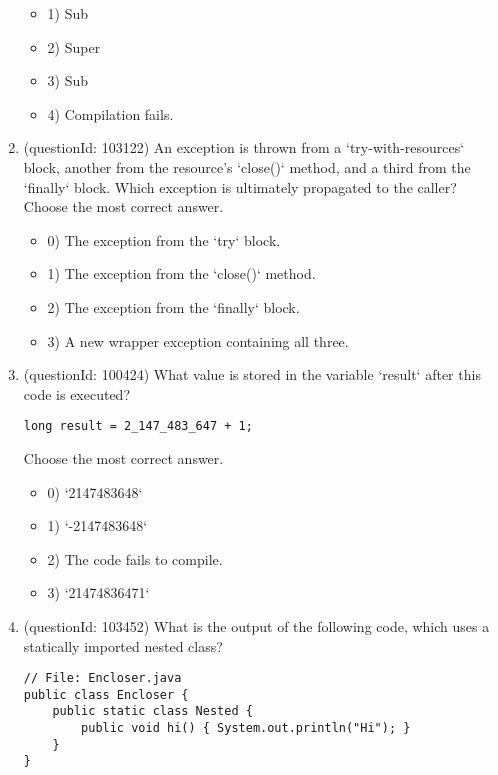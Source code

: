 \documentclass[12pt]{article}
\begin{document}
\begin{enumerate}[label=(\arabic*)]
\begin{itemize}
\item 1) Sub\nSub

\item 2) Super\nSuper

\item 3) Sub\nSuper

\item 4) Compilation fails.

\end{itemize}
\item (questionId: 103122) An exception is thrown from a `try-with-resources` block, another from the resource's `close()` method, and a third from the `finally` block. Which exception is ultimately propagated to the caller?
Choose the most correct answer. 
\begin{itemize}
\item 0) The exception from the `try` block.

\item 1) The exception from the `close()` method.

\item 2) The exception from the `finally` block.

\item 3) A new wrapper exception containing all three.

\end{itemize}
\item (questionId: 100424) What value is stored in the variable `result` after this code is executed?
\begin{verbatim}
long result = 2_147_483_647 + 1;
\end{verbatim}
Choose the most correct answer. 
\begin{itemize}
\item 0) `2147483648`

\item 1) `-2147483648`

\item 2) The code fails to compile.

\item 3) `21474836471`

\end{itemize}
\item (questionId: 103452) What is the output of the following code, which uses a statically imported nested class?
\begin{verbatim}
// File: Encloser.java
public class Encloser {
    public static class Nested {
        public void hi() { System.out.println("Hi"); }
    }
}


\end{verbatim}
\end{enumerate}
\end{document}
